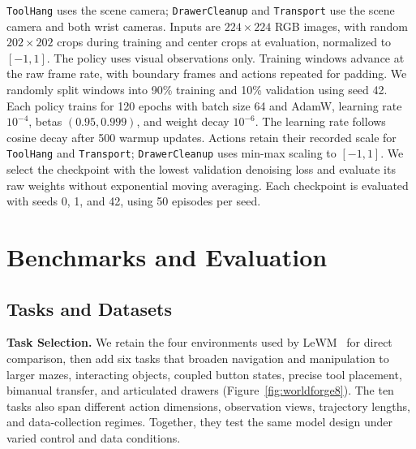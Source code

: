 \documentclass{article} %
\newcommand{\methodname}[1]{\textup{#1}}
\newcommand{\dataset}[1]{\texttt{#1}}
\newcommand{\lead}[1]{\textbf{#1}}
\begin{document}
\dataset{ToolHang} uses the scene camera; \dataset{DrawerCleanup} and
\dataset{Transport} use the scene camera and both wrist cameras. Inputs are
$224\times224$ RGB images, with random $202\times202$ crops during training and
center crops at evaluation, normalized to $[-1,1]$. The policy uses visual
observations only. Training windows advance at the raw frame rate, with boundary
frames and actions repeated for padding. We randomly split windows into 90\%
training and 10\% validation using seed 42. Each policy trains for 120 epochs
with batch size 64 and AdamW, learning rate $10^{-4}$, betas $(0.95,0.999)$, and
weight decay $10^{-6}$. The learning rate follows cosine decay after 500 warmup
updates. Actions retain their recorded scale for \dataset{ToolHang} and
\dataset{Transport}; \dataset{DrawerCleanup} uses min-max scaling to $[-1,1]$.
We select the checkpoint with the lowest validation denoising loss and evaluate
its raw weights without exponential moving averaging. Each checkpoint is
evaluated with seeds 0, 1, and 42, using 50 episodes per seed.



\section{Benchmarks and Evaluation}
\label{app:benchmark-evaluation}
\label{app:datasets}
\label{app:evaluation}

\subsection{Tasks and Datasets}
\label{app:tasks-data}
\label{app:lewm-bench}
\label{app:wf-data}

\lead{Task Selection.} We retain the four environments used by
\methodname{LeWM}~\citep{maes2026lewm} for direct comparison, then add six tasks
that broaden navigation and manipulation to larger mazes, interacting objects,
coupled button states, precise tool placement, bimanual transfer, and articulated
drawers (Figure~\ref{fig:worldforge8}). The ten tasks also span different action
dimensions, observation views, trajectory lengths, and data-collection regimes.
Together, they test the same model design under varied control and data conditions.
\end{document}
